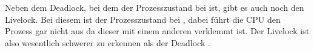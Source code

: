 Neben dem Deadlock, bei dem der Prozesszustand bei  ist, gibt es auch noch den Livelock. Bei diesem ist der Prozesszustand bei , dabei führt die CPU den Prozess gar nicht aus da dieser mit einem anderen verklemmt ist. Der Livelock ist also wesentlich schwerer zu erkennen als der Deadlock .